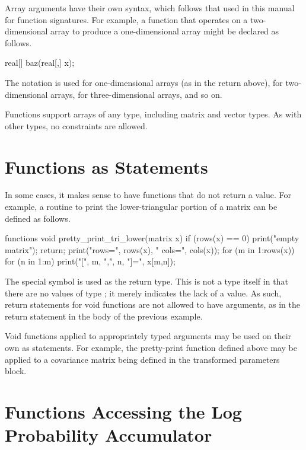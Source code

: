 Array arguments have their own syntax, which follows that used in this
manual for function signatures.  For example, a function that operates
on a two-dimensional array to produce a one-dimensional array might be
declared as follows.
%
\begin{stancode}
real[] baz(real[,] x);
\end{stancode}
%
The notation \code{[\,]} is used for one-dimensional arrays (as in the
return above), \code{[\,,\,]} for two-dimensional arrays,
\code{[\,,\,,\,]} for three-dimensional arrays, and so on.  

Functions support arrays of any type, including matrix and vector
types.  As with other types, no constraints are allowed.


\section{Functions as Statements}

In some cases, it makes sense to have functions that do not return a
value.  For example, a routine to print the lower-triangular portion
of a matrix can be defined as follows.
%
\begin{stancode}
functions {
  void pretty_print_tri_lower(matrix x) {
    if (rows(x) == 0) {
      print("empty matrix");
      return;
    }
    print("rows=", rows(x), " cols=", cols(x));
    for (m in 1:rows(x))
      for (n in 1:m)
        print("[", m, ",", n, "]=", x[m,n]);
  }
}
\end{stancode}
%
The special symbol  is used as the return type.  This is
not a type itself in that there are no values of type ; it
merely indicates the lack of a value.  As such, return statements for
void functions are not allowed to have arguments, as in the return
statement in the body of the previous example.

Void functions applied to appropriately typed arguments may be used on
their own as statements.  For example, the pretty-print function
defined above may be applied to a covariance matrix being defined in
the transformed parameters block. 
%
\begin{stancode}
transformed parameters {
  cov_matrix[K] Sigma;
  ... code to set Sigma ...
  pretty_print_tri_lower(Sigma);
  ...
\end{stancode}


\section{Functions Accessing the Log Probability  Accumulator}

